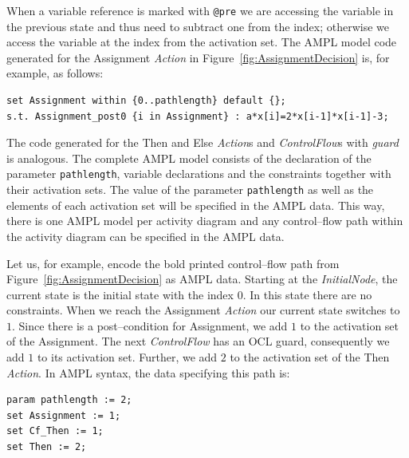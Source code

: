 \documentclass[runningheads,a4paper]{llncs}%
\newcommand{\UMLType}[1]{\textsf{\textit{#1}}} %
\newcommand{\UMLReference}[1]{\textsf{\textit{#1}}} %
\newcommand{\AMPLCode}[1]{\texttt{#1}}
\begin{document}
When a variable reference is marked with \verb=@pre= we are accessing the
variable in the previous state and thus need to subtract one from the index;
otherwise we access the variable at the index from the activation set. The AMPL
model code generated for the Assignment \UMLType{Action} in
Figure~\ref{fig:AssignmentDecision} is, for example, as follows:%
\begin{lstlisting}[basicstyle=\ttfamily,language=ampl,breaklines=true]
set Assignment within {0..pathlength} default {};
s.t. Assignment_post0 {i in Assignment} : a*x[i]=2*x[i-1]*x[i-1]-3;
\end{lstlisting}
The code generated for the Then and Else \UMLType{Action}s and
\UMLType{ControlFlow}s with \UMLReference{guard} is analogous. The complete AMPL
model consists of the declaration of the parameter \AMPLCode{pathlength},
variable declarations and the constraints together with their activation sets.
The value of the parameter \AMPLCode{pathlength} as well as the elements of each
activation set will be specified in the AMPL data. This way, there is one AMPL
model per activity diagram and any control--flow path within the activity diagram
can be specified in the AMPL data.

Let us, for example, encode the bold printed control--flow path from
Figure~\ref{fig:AssignmentDecision} as AMPL data. Starting at the
\UMLType{InitialNode}, the current state is the initial state with the index
$0$. In this state there are no constraints. When we reach the Assignment
\UMLType{Action} our current state switches to $1$. Since there is a
post--condition for Assignment, we add $1$ to the activation set of the
Assignment. The next \UMLType{ControlFlow} has an OCL guard, consequently we add
$1$ to its activation set. Further, we add $2$ to the activation set of the Then
\UMLType{Action}. In AMPL syntax, the data specifying this path is:%
\begin{lstlisting}[basicstyle=\ttfamily,language=ampl]
param pathlength := 2;
set Assignment := 1;
set Cf_Then := 1;
set Then := 2;
\end{lstlisting}%
%
\end{document}
